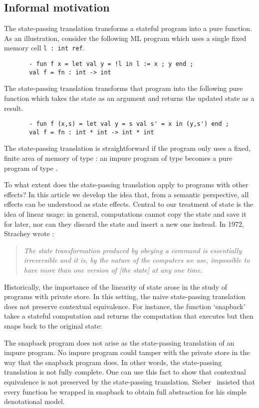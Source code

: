 \documentclass{LMCS}
\newcommand{\hide}[1]{}
\begin{document}
\subsection{Informal motivation}
The state-passing translation 
transforms a stateful program into a pure function. 
As an illustration, consider the following ML program
which uses a single fixed memory cell \verb|l : int ref|.
\begin{verbatim}
       - fun f x = let val y = !l in l := x ; y end ;
       val f = fn : int -> int
\end{verbatim}
The state-passing translation transforms that program into 
the following pure function which takes the state as an argument
and returns the updated state as a result.
\begin{verbatim}
       - fun f (x,s) = let val y = s val s' = x in (y,s') end ;      
       val f = fn : int * int -> int * int
\end{verbatim}
The state-passing translation is straightforward
if the program only uses a fixed, finite area of memory of type :
an impure program of type  becomes a pure program
of type .


To what extent does the state-passing translation apply to programs with
other effects?
In this article we develop the idea
that, from a semantic perspective, 
all effects can be understood as state effects.
Central to our treatment of state is the idea of 
linear usage: in general, computations cannot copy the state and 
save it for later, nor
can they discard the state and insert a new one instead.
In 1972, Strachey wrote \cite{Strachey72}:
\begin{quote}
\emph{The state transformation produced by obeying a command is essentially irreversible and it is, by the nature of the computers we use, impossible to have
more than one version of  \emph{[the state]} at any one time.}
\end{quote}
Historically, the importance of the linearity of state
arose in the study of 
programs with private store. 
In this setting, the naive state-passing translation does not preserve 
contextual equivalence. 
For instance, the function `snapback' takes a
stateful computation  and returns the computation that
executes  but then snaps back to the original state:
\hide{}

The snapback program does not arise as the state-passing translation
of an impure program. 
No impure program could tamper with the private store in the way 
that the snapback program does.
In other words, the state-passing translation
is not fully complete.
One can use this fact to show that 
contextual equivalence is not preserved by the 
state-passing translation. 
Sieber~\cite{DBLP:conf/mfcs/Sieber94} 
insisted that every function be wrapped in snapback to obtain 
full abstraction for his simple denotational model.
\end{document}

